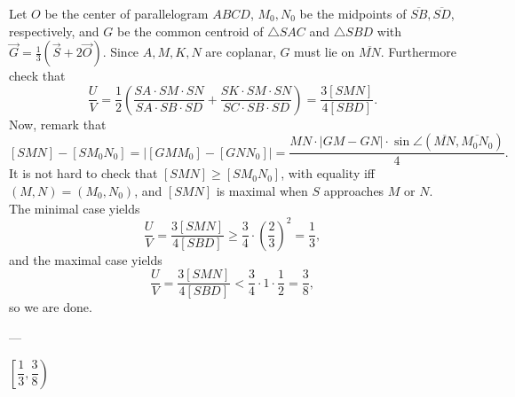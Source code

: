 Let $O$ be the center of parallelogram $ABCD$, $M_0,N_0$ be the midpoints of $\overline{SB},\overline{SD}$, respectively, and $G$ be the common centroid of $\triangle SAC$ and $\triangle SBD$ with $\vec G=\tfrac13\left(\vec S+2\vec O\right)$. Since $A,M,K,N$ are coplanar, $G$ must lie on $\overline{MN}$. Furthermore check that \[\frac UV=\frac12\left(\frac{SA\cdot SM\cdot SN}{SA\cdot SB\cdot SD}+\frac{SK\cdot SM\cdot SN}{SC\cdot SB\cdot SD}\right)=\frac{3[SMN]}{4[SBD]}.\]
Now, remark that \[[SMN]-[SM_0N_0]=\Big|[GMM_0]-[GNN_0]\Big|=\frac{MN\cdot |GM-GN|\cdot\sin\angle(\overline{MN},\overline{M_0N_0})}4.\]
It is not hard to check that $[SMN]\ge [SM_0N_0]$, with equality iff $(M,N)=(M_0,N_0)$, and $[SMN]$ is maximal when $S$ approaches $M$ or $N$. The minimal case yields \[\frac UV=\frac{3[SMN]}{4[SBD]}\ge\frac34\cdot\left(\frac23\right)^2=\frac13,\]
and the maximal case yields\[\frac UV=\frac{3[SMN]}{4[SBD]}<\frac34\cdot 1\cdot\frac12=\frac38,\]
so we are done.

---

$\left[\dfrac13,\dfrac38\right)$
